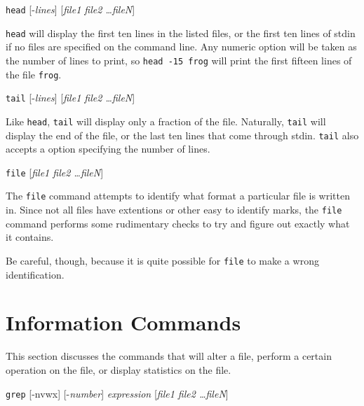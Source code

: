 \pagebreak
\begin{command}
  {\tt head} [-{\sl lines}] [{\sl file1 file2 \ldots fileN}]
\end{command}

{\tt head} will display the first ten lines in the listed files, or
the first ten lines of stdin if no files are specified on the
command line. Any numeric option will be taken as the number of lines
to print, so {\tt head -15 frog} will print the first fifteen lines of
the file {\tt frog}.

\begin{command}
  {\tt tail} [-{\sl lines}] [{\sl file1 file2 \ldots fileN}]
\end{command}

Like {\tt head}, {\tt tail} will display only a fraction of the file.
Naturally, {\tt tail} will display the end of the file, or the last
ten lines that come through stdin. {\tt tail} also accepts a
option specifying the number of lines.

\begin{command}
  {\tt file} [{\sl file1 file2 \ldots fileN}]
\end{command}

The {\tt file} command attempts to identify what format a particular
file is written in. Since not all files have extentions or other easy
to identify marks, the {\tt file} command performs some rudimentary
checks to try and figure out exactly what it contains.

Be careful, though, because it is quite possible for {\tt file} to
make a wrong identification.

\section{Information Commands}

This section discusses the commands that will alter a file, perform a
certain operation on the file, or display statistics on the file.


\begin{command}
  {\tt grep} [-nvwx] [-{\sl number\/}] {\sl
    expression} [{\sl file1 file2 \ldots fileN\/}]
\end{command}

